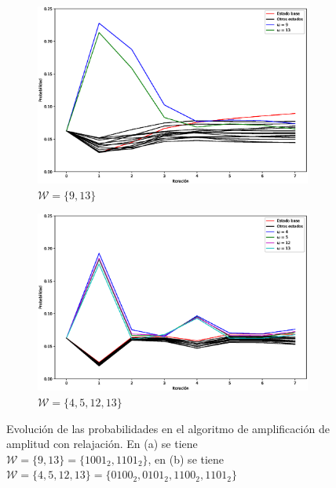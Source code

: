 \begin{figure}[H]
    \centering
    \begin{subfigure}[m]{0.49\textwidth}
        \centering
        \includegraphics[width=0.99\linewidth]{img/grover2loss.eps}
        \caption{$\mathcal{W} = \{9, 13\}$}
    \end{subfigure}
    \begin{subfigure}[m]{0.49\textwidth}
        \centering
        \includegraphics[width=0.99\linewidth]{img/grover3loss.eps}
        \caption{$\mathcal{W} = \{4, 5, 12, 13\}$}
    \end{subfigure}
    \caption[Evolución de las probabilidades en el algoritmo de amplificación de amplitud con relajación]{Evolución de las probabilidades en el algoritmo de amplificación de amplitud con relajación. En (a) se tiene $\mathcal{W} = \{9, 13\} = \{1001_2, 1101_2\}$, en (b) se tiene $\mathcal{W} = \{4, 5, 12, 13\} = \{0100_2, 0101_2, 1100_2, 1101_2\}$}
    \label{fig:groverlosscomp2}
\end{figure}


